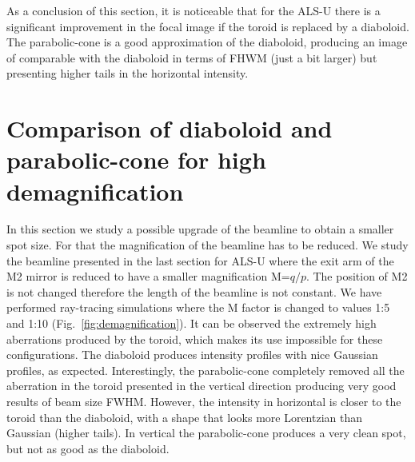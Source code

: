 \documentclass{iucr}              %
\begin{document}
As a conclusion of this section, it is noticeable that for the ALS-U there is a significant improvement in the focal image if the toroid is replaced by a diaboloid. The parabolic-cone is a good approximation of the diaboloid, producing an image of comparable with the diaboloid in terms of FHWM (just a bit larger) but presenting higher tails in the horizontal intensity. 

\section{Comparison of diaboloid and parabolic-cone for high demagnification}
\label{sec:scan}

In this section we study a possible upgrade of the beamline to obtain a smaller spot size. For that the magnification of the beamline has to be reduced. We study the beamline presented in the last section for ALS-U where the exit arm of the M2 mirror is reduced to have a smaller magnification M=$q/p$. The position of M2 is not changed therefore the length of the beamline is not constant. We have performed ray-tracing simulations where the M factor is changed to values 1:5 and 1:10 (Fig.~\ref{fig:demagnification}). It can be observed the extremely high aberrations produced by the toroid, which makes its use impossible for these configurations. The diaboloid produces intensity profiles with nice Gaussian profiles, as expected. Interestingly, the parabolic-cone completely removed all the aberration in the toroid presented in the vertical direction producing very good results of beam size FWHM. However, the intensity in horizontal is closer to the toroid than the diaboloid, with a shape that looks more Lorentzian than Gaussian (higher tails). In vertical the parabolic-cone produces a very clean spot, but not as good as the diaboloid. 
\end{document}
